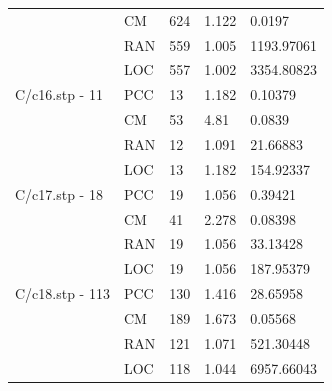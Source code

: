 \documentclass[12pt,a4paper]{article}
\begin{document}
\begin{center}
\begin{tabular}{l|l|l|l|l}
		&CM&624&1.122&0.0197\\
		&RAN&559&1.005&1193.97061\\
		&LOC&557&1.002&3354.80823\\\hline
		C/c16.stp - 11&PCC&13&1.182&0.10379\\
		&CM&53&4.81&0.0839\\
		&RAN&12&1.091&21.66883\\
		&LOC&13&1.182&154.92337\\\hline
		C/c17.stp - 18&PCC&19&1.056&0.39421\\
		&CM&41&2.278&0.08398\\
		&RAN&19&1.056&33.13428\\
		&LOC&19&1.056&187.95379\\\hline
		C/c18.stp - 113&PCC&130&1.416&28.65958\\
		&CM&189&1.673&0.05568\\
		&RAN&121&1.071&521.30448\\
		&LOC&118&1.044&6957.66043\\\hline
	\end{tabular}
\end{center}
\end{document}
